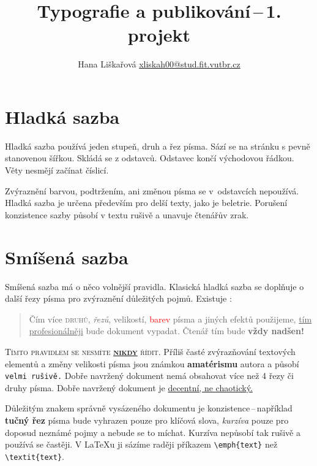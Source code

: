 \documentclass[twocolumn, 10pt, a4paper]{article} %
\title{Typografie a publikování\,--\,1. projekt}
\author{Hana Liškařová \break \href{mailto:xliskah00@fit.vutbr.cz}{xliskah00@stud.fit.vutbr.cz}}
\date{\vspace{-3ex}} %
\begin{document}
\maketitle %



\section{Hladká sazba}
    Hladká sazba používá jeden stupeň, druh a řez písma.
    Sází se na stránku s pevně stanovenou šířkou.
    Skládá se z odstavců. Odstavec končí východovou řádkou.
    Věty nesmějí začínat číslicí.
    
    \par
    Zvýraznění barvou, podtržením, ani změnou písma se v~odstavcích nepoužívá.
    Hladká sazba je určena především pro delší texty, jako je beletrie.
    Porušení konzistence sazby působí v textu rušivě a unavuje čtenářův zrak.



\section{Smíšená sazba}
    Smíšená sazba má o něco volnější pravidla.
    Klasická hladká sazba se doplňuje o další řezy písma pro zvýraznění důležitých pojmů.
    Existuje :
        \begin{quotation}
            Čím více \textsc{druhů}, \emph{řezů}, {\tiny velikostí}, \textcolor{red}{barev} písma a jiných {\selectfont efektů} použijeme, \underline{tím profesionálněji} bude {\selectfont dokument} vypadat.
            Čtenář tím bude {\LARGE \textbf{vždy nadšen!}}
        \end{quotation}
    
    \textsc{Tímto pravidlem se nesmíte \underline{\textbf{nikdy}} řídit.}
    Příliš časté zvýrazňování textových elementů a změny {\tiny velikosti} písma jsou známkou \textbf{amatérismu} autora a působí \texttt{velmi rušivě.}
    Dobře navržený dokument nemá obsahovat více než 4 řezy či druhy písma.
    Dobře navržený dokument je \underline{decentní, ne chaotický.}
    \par
    
    Důležitým znakem správně vysázeného dokumentu je konzistence\,--\,například \textbf{tučný řez} písma bude vyhrazen pouze pro klíčová slova, \textit{kurzíva} pouze pro doposud neznámé pojmy a nebude se to míchat.
    Kurzíva nepůsobí tak rušivě a používá se častěji.
    V \LaTeX u ji sázíme raději příkazem \verb|\emph{text}| než \verb|\textit{text}|.
    \par
    
\end{document}
